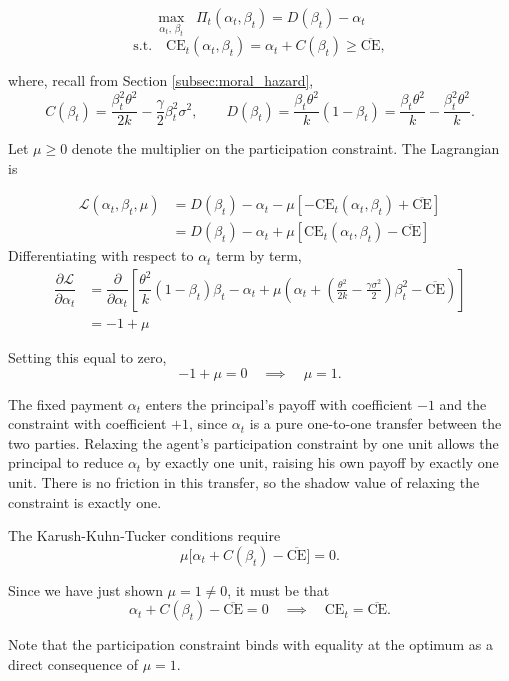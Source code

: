 \documentclass{article}
\theoremstyle{definition}
\theoremstyle{plain}
\newcommand{\partder}[2]{\dfrac{\partial {#1}}{\partial {#2}}}
\newcommand{\Lag}{\mathcal{L}}
\begin{document}
\[
\max_{\alpha_t,\,\beta_t} \;\; \Pi_t(\alpha_t,\beta_t) = D(\beta_t) - \alpha_t
\]
\[
\text{s.t.} \quad \text{CE}_t(\alpha_t,\beta_t) = \alpha_t + C(\beta_t) \geq \overline{\text{CE}},
\]

where, recall from Section \ref{subsec:moral_hazard},
\[
C(\beta_t) = \frac{\beta_t^2\theta^2}{2k} - \frac{\gamma}{2}\beta_t^2\sigma^2, \qquad D(\beta_t) = \frac{\beta_t\theta^2}{k}(1-\beta_t) = \frac{\beta_t\theta^2}{k} - \frac{\beta_t^2\theta^2}{k}.
\]

Let $\mu \geq 0$ denote the multiplier on the participation constraint. The Lagrangian is

\begin{align*}
    \Lag(\alpha_t,\beta_t,\mu)&=D(\beta_t)-\alpha_t- \mu\left[ -\text{CE}_t(\alpha_t,\beta_t)+\overline{\text{CE}}\right]\\
    &=D(\beta_t)-\alpha_t + \mu\left[\text{CE}_t(\alpha_t,\beta_t) - \overline{\text{CE}}\right]
\end{align*}
Differentiating with respect to $\alpha_t$ term by term,
\begin{align*}  
    \partder{\Lag}{\alpha_t}&= \partder{}{\alpha_t}\left[ \dfrac{\theta^2}{k}(1-\beta_t)\beta_t - \alpha_t + \mu\left( \alpha_t + \left(\frac{ \theta^2}{2k} - \frac{\gamma \sigma^2}{2} \right)\beta^2_t - \overline{\text{CE}}\right) \right]\\
    &=-1+\mu
\end{align*}

Setting this equal to zero,
\[
-1 + \mu = 0 \quad \implies \quad \mu = 1.
\]

The fixed payment $\alpha_t$ enters the principal's payoff with coefficient $-1$ and the constraint with coefficient $+1$, since $\alpha_t$ is a pure one-to-one transfer between the two parties. Relaxing the agent's participation constraint by one unit allows the principal to reduce $\alpha_t$ by exactly one unit, raising his own payoff by exactly one unit. There is no friction in this transfer, so the shadow value of relaxing the constraint is exactly one.

The Karush-Kuhn-Tucker conditions require
\[
\mu\big[\alpha_t + C(\beta_t) - \overline{\text{CE}}\big] = 0.
\]

Since we have just shown $\mu = 1 \neq 0$, it must be that
\[
\alpha_t + C(\beta_t) - \overline{\text{CE}} = 0 \quad \implies \quad \text{CE}_t = \overline{\text{CE}}.
\]

Note that the participation constraint binds with equality at the optimum as a direct consequence of $\mu = 1$.
\end{document}
